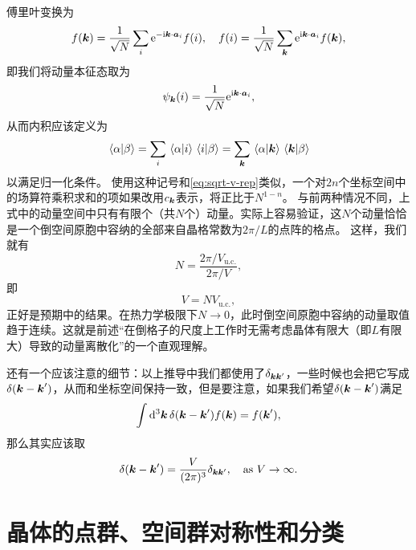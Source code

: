 \begin{enumerate}
\begin{equation}
    \end{equation}
    傅里叶变换为
    \begin{equation}
        f(\vb*{k}) = \frac{1}{\sqrt{N}} \sum_{i} \mathrm{e}^{- \mathrm{i} \vb*{k} \cdot \vb*{a}_i} f(i), \quad f(i) = \frac{1}{\sqrt{N}} \sum_{\vb*{k}} \mathrm{e}^{\mathrm{i} \vb*{k} \cdot \vb*{a}_i} f(\vb*{k}),
        \label{eq:lattice-fourier}
    \end{equation}
    即我们将动量本征态取为
    \begin{equation}
        \psi_{\vb*{k}}(i) = \frac{1}{\sqrt{N}} \mathrm{e}^{\mathrm{i} \vb*{k} \cdot \vb*{a}_i},
    \end{equation}
    从而内积应该定义为
    \begin{equation}
        \braket*{\alpha}{\beta} = \sum_i \braket*{\alpha}{i} \braket*{i}{\beta} = \sum_{\vb*{k}} \braket*{\alpha}{\vb*{k}} \braket*{\vb*{k}}{\beta}
        \label{eq:sum-over-lattice}
    \end{equation}
    以满足归一化条件。
    使用这种记号和\eqref{eq:sqrt-v-rep}类似，一个对$2n$个坐标空间中的场算符乘积求和的项如果改用$c_{\vb*{k}}$表示，将正比于$N^{1-n}$。
    与前两种情况不同，上式中的动量空间中只有有限个（共$N$个）动量。实际上容易验证，这$N$个动量恰恰是一个倒空间原胞中容纳的全部来自晶格常数为$2\pi / L$的点阵的格点。
    这样，我们就有
    \[
        N = \frac{2\pi / V_\text{u.c.}}{2\pi / V},
    \]
    即
    \begin{equation}
        V = N V_\text{u.c.},
    \end{equation}
    正好是预期中的结果。在热力学极限下$N \to 0$，此时倒空间原胞中容纳的动量取值趋于连续。这就是前述“在倒格子的尺度上工作时无需考虑晶体有限大（即$L$有限大）导致的动量离散化”的一个直观理解。
\end{enumerate}

还有一个应该注意的细节：以上推导中我们都使用了$\delta_{\vb*{k} \vb*{k}'}$，一些时候也会把它写成$\delta(\vb*{k}- \vb*{k}')$，从而和坐标空间保持一致，但是要注意，如果我们希望$\delta(\vb*{k} - \vb*{k}')$满足
\[
    \int \dd[3]{\vb*{k}} \delta(\vb*{k} - \vb*{k}') f(\vb*{k}) = f(\vb*{k}'),
\]
那么其实应该取
\begin{equation}
    \delta(\vb*{k} - \vb*{k}') = \frac{V}{(2\pi)^3} \delta_{\vb*{k} \vb*{k}'} , \quad \text{as $V \to \infty$}.
\end{equation}

\section{晶体的点群、空间群对称性和分类}

